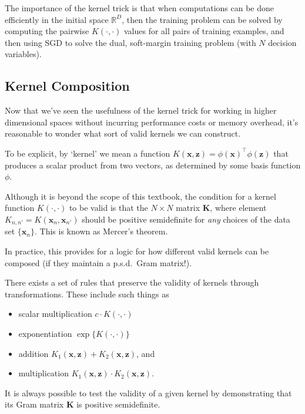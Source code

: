 The importance of the kernel trick is that when computations can be done efficiently in the initial space $\mathbb{R}^D$, then the training problem can be solved by computing the pairwise $K(\cdot,\cdot)$ values for all pairs of training examples, and then using SGD to solve the dual, soft-margin training problem (with $N$ decision variables).


\subsection{Kernel Composition}

Now that we've seen the usefulness of the kernel trick for working in higher dimensional spaces without incurring performance costs or memory overhead, it's reasonable to wonder what sort of valid kernels we can construct.

To be explicit, by `kernel' we mean a function $K(\textbf{x}, \textbf{z}) = \phi(\textbf{x})^\top \phi(\textbf{z})$ that produces a scalar product from two vectors, as determined by some basis function $\phi$.

Although it is beyond the scope of this textbook, the condition for a kernel function $K(\cdot,\cdot)$ to be valid is that the $N\times N$ matrix $\mathbf{K}$, where element $K_{n,n'}= K(\textbf{x}_{n}, \textbf{x}_{n'})$ should be positive semidefinite for {\em any} choices of the data set $\{ \textbf{x}_{n} \}$. This is known as Mercer's theorem.


In practice,  this provides for a logic for how different valid kernels can be composed (if they maintain a p.s.d.~Gram matrix!). 
%

There exists a set of rules that preserve the validity of kernels through transformations. These include such things as
%
\begin{itemize}
\item scalar multiplication $c \cdot K(\cdot,\cdot)$
\item exponentiation $\exp\{K(\cdot,\cdot)\}$
\item addition $K_{1}(\textbf{x}, \textbf{z}) + K_{2}(\textbf{x}, \textbf{z})$, and
\item multiplication $K_{1}(\textbf{x}, \textbf{z}) \cdot K_{2}(\textbf{x}, \textbf{z})$.
\end{itemize}

It is always possible to test the validity of a given kernel by demonstrating that its Gram matrix $\textbf{K}$ is positive semidefinite.
